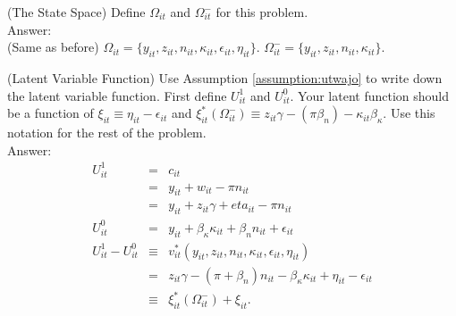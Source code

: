\begin{exercise} (The State Space)
Define $\Omega_{it}$ and $\Omega_{it}^-$ for this problem.\\
\noindent Answer:\\
\noindent (Same as before) $\Omega_{it} = \{ y_{it}, z_{it}, n_{it}, \kappa_{it}, \epsilon_{it}, \eta_{it} \}$. $\Omega_{it}^{-} = \{ y_{it}, z_{it}, n_{it}, \kappa_{it} \}$. 
\end{exercise}

\begin{exercise} (Latent Variable Function)
Use Assumption \ref{assumption:utwajo} to write down the latent variable function. First define $U_{it}^1$ and $U_{it}^0$. Your latent function should be a function of $\xi_{it} \equiv \eta_{it} - \epsilon_{it}$ and  $\xi_{it}^*\left( \Omega_{it}^- \right) \equiv z_{it} \gamma - \left( \pi \beta_{n} \right) - \kappa_{it} \beta_{\kappa}$. Use this notation for the rest of the problem.\\
\noindent Answer:\\
\begin{eqnarray}
U_{it}^{1} &=& c_{it} \nonumber \\
           &=& y_{it} + w_{it} - \pi n_{it} \nonumber \\
           &=& y_{it} + z_{it} \gamma + eta_{it} - \pi n_{it} \\
U_{it}^{0} &=& y_{it} + \beta_{\kappa} \kappa_{it} + \beta_{n} n_{it} + \epsilon_{it} \\
U_{it}^{1} - U_{it}^{0} &\equiv& v_{it}^{*} \left( y_{it}, z_{it}, n_{it}, \kappa_{it}, \epsilon_{it}, \eta_{it}  \right) \nonumber \\ 
           &=& z_{it} \gamma - \left( \pi + \beta_{n} \right) n_{it} - \beta_{\kappa} \kappa_{it} + \eta_{it} - \epsilon_{it} \nonumber \\
           & \equiv & \xi_{it}^{*} \left( \Omega_{it}^{-} \right) + \xi_{it}.
\end{eqnarray}
\end{exercise}

